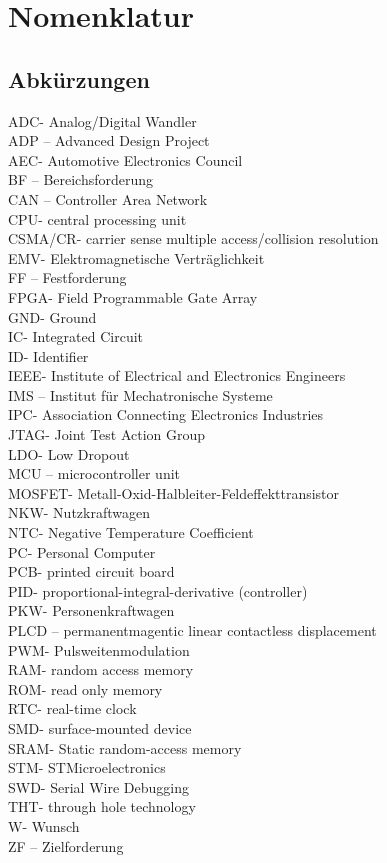 \chapter*{Nomenklatur}
\section*{Abkürzungen}
ADC- Analog/Digital Wandler\\
ADP – Advanced Design Project\\
AEC- Automotive Electronics Council\\
BF – Bereichsforderung\\
CAN – Controller Area Network\\
CPU- central processing unit\\
CSMA/CR- carrier sense multiple access/collision resolution\\
EMV- Elektromagnetische Verträglichkeit\\
FF – Festforderung\\
FPGA- Field Programmable Gate Array\\
GND- Ground\\
IC- Integrated Circuit\\
ID- Identifier\\
IEEE- Institute of Electrical and Electronics Engineers\\
IMS – Institut für Mechatronische Systeme\\
IPC- Association Connecting Electronics Industries\\
JTAG- Joint Test Action Group\\
LDO- Low Dropout\\
MCU – microcontroller unit\\
MOSFET- Metall-Oxid-Halbleiter-Feldeffekttransistor\\
NKW- Nutzkraftwagen\\
NTC- Negative Temperature Coefficient\\
PC- Personal Computer\\
PCB- printed circuit board\\
PID- proportional-integral-derivative (controller)\\
PKW- Personenkraftwagen\\
PLCD – permanentmagentic linear contactless displacement\\
PWM- Pulsweitenmodulation\\
RAM- random access memory\\
ROM- read only memory\\
RTC- real-time clock\\
SMD- surface-mounted device\\
SRAM- Static random-access memory\\
STM- STMicroelectronics\\
SWD- Serial Wire Debugging\\
THT- through hole technology\\
W- Wunsch\\
ZF – Zielforderung\\
